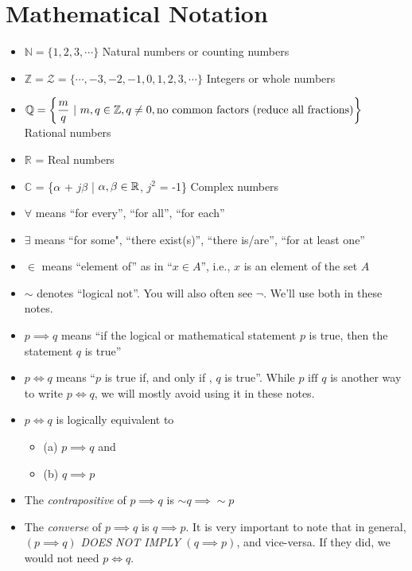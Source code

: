 \section{Mathematical Notation}
    \begin{itemize}
        \item[] $\mathbb{N} = \{1,2,3,\dotsb\}$ Natural numbers or counting numbers
        \item[] $\mathbb{Z} = \mathcal{Z} = \{\dotsb, -3, -2, -1, 0, 1, 2, 3, \dotsb\}$ Integers or whole numbers
        \item[] $\mathbb{Q} = \left\{\dfrac{m}{q}~ |~ m,q \in \mathbb Z, q \neq 0, \textnormal{no common factors (reduce all fractions)}\right\}$ Rational numbers
        \item[] $\mathbb{R}$ = Real numbers
        \item[] $\mathbb{C}$ = \{$\alpha$ + $j\beta$ | $\alpha, \beta \in \mathbb R$, $j^2$ = -1\} Complex numbers
        \item[] $\forall$ means ``for every'', ``for all'', ``for each''
        \item[] $\exists$ means ``for some", ``there exist(s)'', ``there is/are'', ``for at least one''
        \item[] $\in$ means ``element of'' as in ``$x\in A$'', i.e., $x$ is an element of the set $A$
        \item[] $\sim$ denotes ``logical not''.  You will also often see $\neg$. We'll use both in these notes. 
        \item[] $p \implies q$ means ``if the logical or mathematical statement  $p$ is true, then the statement $q$ is true''
        \item[] $p \iff q$ means ``$p$ is true if, and only if , $q$ is true''. While $p \text{ iff } q$ is another way to write $p \iff q$, we will mostly avoid using it in these notes.
        \item[] $p \iff q$ is logically equivalent to 
        \begin{itemize}
            \item[] (a) $p \implies q$ and\ %
            \item[] (b) $q \implies p$
        \end{itemize}
        \item[] The \emph{contrapositive} of $p \implies q$ is $\sim q \implies \sim p$ 
        \item[] The \emph{converse} of $p \implies q$ is $q \implies p$. It is very important to note that in general, $(p \implies q)$ \emph{DOES NOT IMPLY} $(q \implies p)$, and vice-versa. If they did, we would not need $p \iff q$.

\end{itemize}
